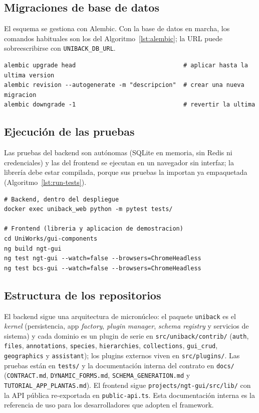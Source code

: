 \subsection{Migraciones de base de datos}
El esquema se gestiona con Alembic. Con la base de datos en marcha, los
comandos habituales son los del Algoritmo~\ref{lst:alembic}; la URL puede
sobreescribirse con \texttt{UNIBACK\_\allowbreak DB\_\allowbreak URL}.

\begin{lstlisting}[style=docker, caption={Comandos de migración con Alembic}, label={lst:alembic}]
alembic upgrade head                              # aplicar hasta la ultima version
alembic revision --autogenerate -m "descripcion"  # crear una nueva migracion
alembic downgrade -1                              # revertir la ultima
\end{lstlisting}

\subsection{Ejecución de las pruebas}
Las pruebas del backend son autónomas (SQLite en memoria, sin Redis ni
credenciales) y las del frontend se ejecutan en un navegador sin interfaz; la
librería debe estar compilada, porque sus pruebas la importan ya empaquetada
(Algoritmo~\ref{lst:run-tests}).

\begin{lstlisting}[style=docker, caption={Ejecución de las baterías de pruebas}, label={lst:run-tests}]
# Backend, dentro del despliegue
docker exec uniback_web python -m pytest tests/

# Frontend (libreria y aplicacion de demostracion)
cd UniWorks/gui-components
ng build ngt-gui
ng test ngt-gui --watch=false --browsers=ChromeHeadless
ng test bcs-gui --watch=false --browsers=ChromeHeadless
\end{lstlisting}

\subsection{Estructura de los repositorios}
El backend sigue una arquitectura de micronúcleo: el paquete \texttt{uniback}
es el \emph{kernel} (persistencia, app \emph{factory}, \emph{plugin manager},
\emph{schema registry} y servicios de sistema) y cada dominio es un plugin de
serie en \texttt{src/\allowbreak uniback/\allowbreak contrib/} (\texttt{auth}, \texttt{files},
\texttt{annotations}, \texttt{species}, \texttt{hierarchies},
\texttt{collections}, \texttt{gui\_\allowbreak crud}, \texttt{geographics} y
\texttt{assistant}); los plugins
externos viven en \texttt{src/\allowbreak plugins/}. Las pruebas están en \texttt{tests/} y
la documentación interna del contrato en \texttt{docs/}
(\texttt{CONTRACT.\allowbreak md}, \texttt{DYNAMIC\_\allowbreak FORMS.\allowbreak md},
\texttt{SCHEMA\_\allowbreak GENERATION.\allowbreak md} y
\texttt{TUTORIAL\_\allowbreak APP\_\allowbreak PLANTAS.\allowbreak md}). El
frontend sigue \texttt{projects/\allowbreak ngt-\allowbreak gui/\allowbreak src/\allowbreak lib/} con la API pública
re-exportada en \texttt{public-\allowbreak api.\allowbreak ts}. Esta documentación interna es la
referencia de uso para los desarrolladores que adopten el \gls{framework}.
